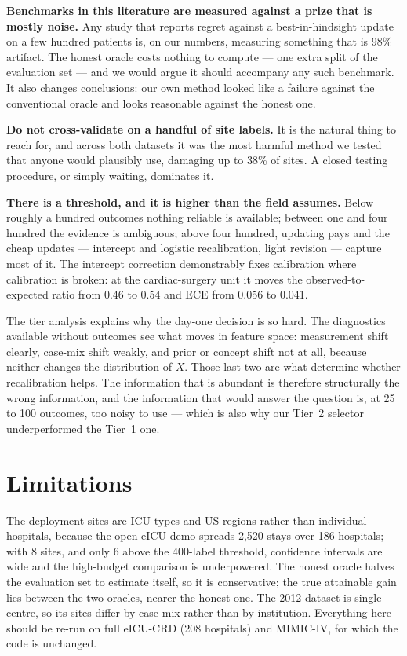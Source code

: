 \documentclass[10pt,twocolumn]{article}
\begin{document}
\textbf{Benchmarks in this literature are measured against a prize that is
mostly noise.} Any study that reports regret against a best-in-hindsight
update on a few hundred patients is, on our numbers, measuring something that
is 98\% artifact. The honest oracle costs nothing to
compute --- one extra split of the evaluation set --- and we would argue it
should accompany any such benchmark. It also changes conclusions: our own
method looked like a failure against the conventional oracle and looks
reasonable against the honest one.

\textbf{Do not cross-validate on a handful of site labels.} It is the
natural thing to reach for, and across both datasets it was the most harmful
method we tested that anyone would plausibly use, damaging up to
38\% of sites. A closed testing procedure, or simply
waiting, dominates it.

\textbf{There is a threshold, and it is higher than the field assumes.}
Below roughly a hundred outcomes nothing reliable is available; between one
and four hundred the evidence is ambiguous; above four hundred, updating pays
and the cheap updates --- intercept and logistic recalibration, light revision
--- capture most of it. The intercept correction demonstrably fixes
calibration where calibration is broken: at the cardiac-surgery unit it moves
the observed-to-expected ratio from 0.46 to
0.54 and ECE from 0.056 to
0.041.

The tier analysis explains why the day-one decision is so hard. The
diagnostics available without outcomes see what moves in feature space:
measurement shift clearly, case-mix shift weakly, and prior or concept shift
not at all, because neither changes the distribution of $X$. Those last two
are what determine whether recalibration helps. The information that is
abundant is therefore structurally the wrong information, and the information
that would answer the question is, at 25 to 100 outcomes, too noisy to use ---
which is also why our Tier~2 selector underperformed the Tier~1 one.

\section{Limitations}
The deployment sites are ICU types and US regions rather than individual
hospitals, because the open eICU demo spreads 2{,}520 stays over 186
hospitals; with 8 sites, and only 6 above the 400-label
threshold, confidence intervals are wide and the high-budget comparison is
underpowered. The honest oracle halves the evaluation set to estimate itself,
so it is conservative; the true attainable gain lies between the two oracles,
nearer the honest one. The 2012 dataset is single-centre, so its sites differ
by case mix rather than by institution. Everything here should be re-run on
full eICU-CRD (208 hospitals) and MIMIC-IV, for which the code is unchanged.
\end{document}
